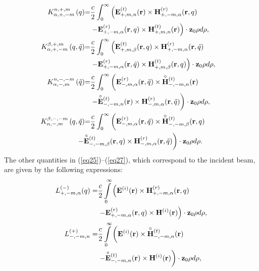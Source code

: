 \documentclass[conference,a4paper]{IEEEtran}
\begin{document}
\begin{align}\label{eq11}
\hspace{-1.5mm}{K}^{{n},+,m}_{\a,+,-m}\,({q}){=}&\frac{c}{2} \int_{0}^{\infty}\left({\bf E}^{(t)}_{+,m,{n}}({\bf r})\times{\bf H}^{(r)}_{+,-m,\a}({\bf r},{q})\right.\nonumber\\
&\left. - {\bf E}^{(r)}_{+,-{m},\a}({\bf r},{q})\times{\bf H}^{(t)}_{+,m,{n}}({\bf r})\right)\cdot{\bf z}_0\rho{d}\rho,\nonumber\\
\hspace{-3mm}{K}^{\b,+,m}_{\a,+,-m}\,(q,\tilde{q}){=}&\frac{c}{2}\int_{0}^{\infty}\left({\bf E}^{(t)}_{+,m,\b}({\bf r},q)\times{\bf H}^{(r)}_{+,-m,\a}({\bf r},\tilde{q})\right.\nonumber\\
&\left. - {\bf E}^{(r)}_{+,-{m},\a}({\bf r},\tilde{q})\times{\bf H}^{(t)}_{+,m,\b}({\bf r},q)\right)\cdot{\bf z}_0\rho{d}\rho,\nonumber\\
\hspace{-3mm}{K}^{n,-,-m}_{\a,-,m}\,(\tilde{q}){=}&\frac{c}{2}\int_{0}^{\infty}\left({\bf E}^{(r)}_{-,{m},\a}({\bf r},\tilde{q})\times\lefteqn{\cir{\phantom{\bf H}}}{\bf H}^{(t)}_{-,-m,n}({\bf r})\right.\nonumber\\
&\left. -\lefteqn{\cir{\phantom{\bf E}}}{\bf E}^{(t)}_{-,-m,n}({\bf r})\times{\bf H}^{(r)}_{-,m,\a}({\bf r},\tilde{q}) \right)\cdot{\bf z}_0\rho{d}\rho,\nonumber\\
\hspace{-3mm}{K}^{\b,-,-m}_{\a,-,m}\,(q,\tilde{q}){=}&\frac{c}{2}\int_{0}^{\infty}\left({\bf E}^{(r)}_{-,{m},\a}({\bf r},\tilde{q})\times\lefteqn{\cir{\phantom{\bf H}}}{\bf H}^{(t)}_{-,-m,\b}({\bf r},q)\right.\nonumber\\
&\hspace{-7mm}\left. -\lefteqn{\cir{\phantom{\bf E}}}{\bf E}^{(t)}_{-,-m,\b}({\bf r},q)\times{\bf H}^{(r)}_{-,m,\a}({\bf r},\tilde{q}) \right)\cdot{\bf z}_0\rho{d}\rho.
\end{align}
The other quantities in (\ref{eq25})--(\ref{eq27}), which correspond to the incident beam, are given by the following expressions:
\begin{align}\label{eq12}
 L_{+ ,-m,\a}^{(-)}(q)= & \frac{c}{2}\int\limits_0^\infty \left({\bf{E}}^{(i)}({\bf{r}}) \times {\bf{H}}_{+, - m,\alpha }^{(r)}({\bf{r}},q)\right.\nonumber\\
&\left. -   {\bf{E}}_{+, - m,\alpha }^{(r)}({\bf{r}},q) \times {\bf{H}}^{(i)}({\bf{r}})\right)\cdot{{\bf{z}}_0}\rho d\rho ,\notag\\
L_{- ,-m,n}^{(+)} = & \frac{c}{2}\int\limits_0^\infty \left({\bf{E}}^{(i)}({\bf{r}}) \times \lefteqn{\cir{\phantom{\bf H}}}{\bf{H}}_{-, - m,n }^{(t)}({\bf{r}})\right.\nonumber\\
&\left. -   \lefteqn{\cir{\phantom{\bf E}}}{\bf{E}}_{-, - m,n }^{(t)}({\bf{r}}) \times {\bf{H}}^{(i)}({\bf{r}})\right)\cdot{{\bf{z}}_0}\rho d\rho,\notag
\end{align}
\end{document}

